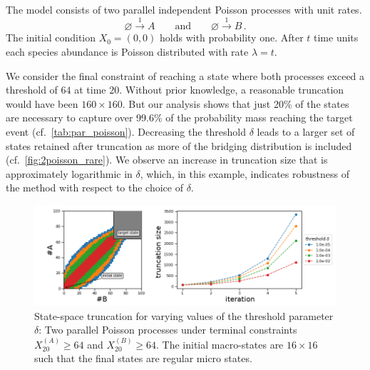 \begin{model}\label{model:par_poisson}
The model consists of two parallel independent Poisson processes with unit rates.
$$ \varnothing \xrightarrow{1} A \qquad\text{and}\qquad \varnothing \xrightarrow{1} B\,. $$
The initial condition $X_0=(0,0)$ holds with probability one. After $t$ time units each species abundance
is Poisson distributed with rate $\lambda=t$.
\end{model}
We consider the final constraint of reaching a state where both
processes exceed a threshold of $64$ at time $20$.
Without prior knowledge, a reasonable truncation would have been $160\times 160$. But our analysis shows that just \num{20}\% of the states are necessary to capture over \num{99.6}\% of the probability mass reaching the
target event (cf.\ \autoref{tab:par_poisson}).
Decreasing the threshold $\delta$ leads to a larger set of states retained after truncation as more of the bridging distribution is included (cf.\ \autoref{fig:2poisson_rare}).
We observe an increase in truncation size that is approximately
logarithmic in $\delta$, which, in this example, indicates robustness of the method with respect to the choice of $\delta$.
\begin{figure}[!t]
    \centering
    \includegraphics[width=\textwidth]{gfx/truncs.png}
	\caption[State-space truncation for varying values of the
	threshold parameter $\delta$]{State-space truncation for varying values of the
    threshold parameter $\delta$: Two parallel Poisson processes under terminal constraints $X_{20}^{(A)} \geq 64$ and $X_{20}^{(B)}\geq 64$.
    The initial macro-states are $16\times 16$ such that the final
    states are regular micro states.}
    \label{fig:2poisson_rare}
\end{figure}

